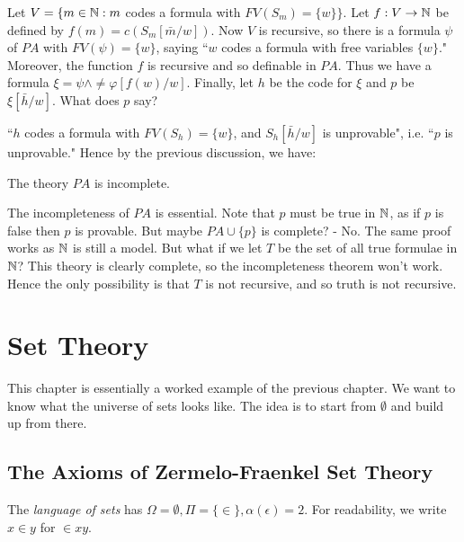 \documentclass[10pt,a4paper]{article}
\begin{document}
Let $V = \{m \in \mathbb{N}: m$ codes a formula with $FV(S_m) = \{w\}\}$. Let $f:V \to \mathbb{N}$ be defined by $f(m) = c(S_m[\bar{m}/w])$. Now $V$ is recursive, so there is a formula $\psi$ of $PA$ with $FV(\psi) = \{w\}$, saying ``$w$ codes a formula with free variables $\{w\}$." Moreover, the function $f$ is recursive and so definable in $PA$. Thus we have a formula $\xi = \psi \wedge \neq \varphi[f(w)/w]$. Finally, let $h$ be the code for $\xi$ and $p$ be $\xi[\bar{h}/w]$. What does $p$ say?

``$h$ codes a formula with $FV(S_h) = \{w\}$, and $S_h[\bar{h}/w]$ is unprovable", i.e. ``$p$ is unprovable." Hence by the previous discussion, we have:
\begin{theorem}
The theory $PA$ is incomplete.
\end{theorem}
The incompleteness of $PA$ is essential. Note that $p$ must be true in $\mathbb{N}$, as if $p$ is false then $p$ is provable. But maybe $PA\cup\{p\}$ is complete? - No. The same proof works as $\mathbb{N}$ is still a model. But what if we let $T$ be the set of all true formulae in $\mathbb{N}$? This theory is clearly complete, so the incompleteness theorem won't work. Hence the only possibility is that $T$ is not recursive, and so truth is not recursive.
\section{Set Theory}
This chapter is essentially a worked example of the previous chapter. We want to know what the universe of sets looks like. The idea is to start from $\emptyset$ and build up from there.
\subsection{The Axioms of Zermelo-Fraenkel Set Theory}
The \emph{language of sets} has $\Omega = \emptyset, \Pi = \{\in\}, \alpha(\epsilon) = 2$. For readability, we write $x \in y$ for $\in x y$.
\end{document}
